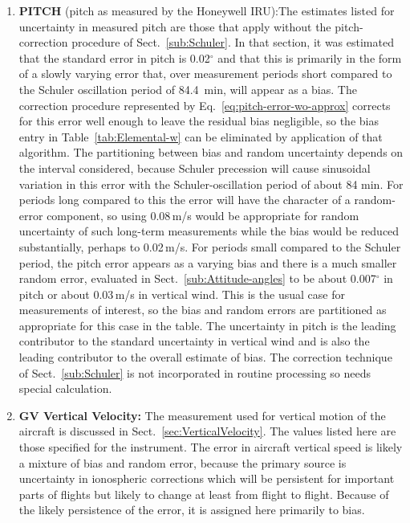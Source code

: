 \documentclass[12pt,twoside,english]{article}\usepackage[]{graphicx}\usepackage[]{color}
\let\OrgIndex\index
\renewcommand*{\index}[1]{\OrgIndex{#1}}
\begin{document}
\begin{enumerate}
\item \textbf{PITCH} (pitch as measured by the Honeywell IRU):The estimates listed for uncertainty in measured pitch are those that apply without the pitch-correction procedure of Sect.~\ref{sub:Schuler}. In that section, it was estimated that the standard error in pitch is 0.02$^{\circ}$ and that this is primarily in the form of a slowly varying error that, over measurement periods short compared to the Schuler oscillation period of 84.4~min, will appear as a bias. The correction procedure represented by Eq.~\ref{eq:pitch-error-wo-approx} corrects for this error well enough to leave the residual bias negligible, so the bias entry in Table~\ref{tab:Elemental-w} can be eliminated by application of that algorithm. The partitioning between bias and random uncertainty depends on the interval considered, because Schuler precession will cause sinusoidal variation in this error with the Schuler-oscillation period of about 84 min. For periods long compared to this the error will have the character of a random-error component, so using 0.08\,m/s would be appropriate for random uncertainty of such long-term measurements while the bias would be reduced substantially, perhaps to 0.02\,m/s. For periods small compared to the Schuler period, the pitch error appears as a varying bias and there is a much smaller random error, evaluated in Sect.~\ref{sub:Attitude-angles} to be about 0.007$^{\circ}$ in pitch or about 0.03\,m/s in vertical wind. This is the usual case for measurements of interest, so the bias and random errors are partitioned as appropriate for this case in the table. The uncertainty in pitch is the leading contributor to the standard uncertainty in vertical wind and is also the leading contributor to the overall estimate of bias. The correction technique of Sect.~\ref{sub:Schuler} is not incorporated in routine processing so needs special calculation.  
\item \textbf{GV Vertical Velocity:} The measurement used for vertical motion of the aircraft is discussed in Sect.~\ref{sec:VerticalVelocity}. The values listed here are those specified for the instrument.
The error in aircraft vertical speed is likely a mixture of bias and random error, because the primary source is uncertainty in ionospheric corrections which will be persistent for important parts of flights but likely to change at least from flight to flight. Because of the likely persistence of the error, it is assigned here primarily to bias.  

\end{enumerate}
\end{document}
